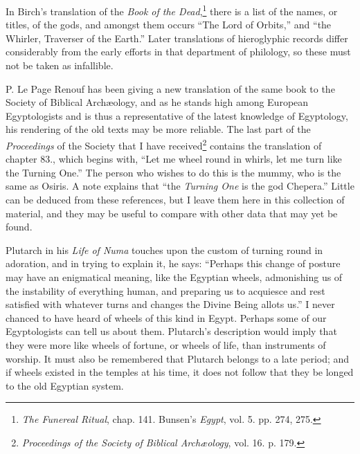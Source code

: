 \documentclass[a4paper, 11pt, oneside, polutonikogreek, english]{article}
\begin{document}
In Birch's translation of the \emph{Book of the Dead},\footnote{\emph{The Funereal Ritual}, chap. 141. Bunsen's \emph{Egypt}, vol. 5. pp. 274, 275.} there is a list of the names, or titles, of the gods, and amongst them occurs ``The Lord of Orbits,'' and ``the Whirler, Traverser of the Earth.'' Later translations of hieroglyphic records differ considerably from the early efforts in that department of philology, so these must not be taken as infallible.

P. Le Page Renouf has been giving a new translation of the same book to the Society of Biblical Archæology, and as he stands high among European Egyptologists and is thus a representative of the latest knowledge of Egyptology, his rendering of the old texts may be more reliable. The last part of the \emph{Proceedings} of the Society that I have received\footnote{\emph{Proceedings of the Society of Biblical Archæology}, vol. 16. p. 179.} contains the translation of chapter 83., which begins with, ``Let me wheel round in whirls, let me turn like the Turning One.'' The person who wishes to do this is the mummy, who is the same as Osiris. A note explains that ``the \emph{Turning One} is the god Chepera.'' Little can be deduced from these references, but I leave them here in this collection of material, and they may be useful to compare with other data that may yet be found.

Plutarch in his \emph{Life of Numa} touches upon the custom of turning round in adoration, and in trying to explain it, he says: ``Perhaps this change of posture may have an enigmatical meaning, like the Egyptian wheels, admonishing us of the instability of everything human, and preparing us to acquiesce and rest satisfied with whatever turns and changes the Divine Being allots us.'' I never chanced to have heard of wheels of this kind in Egypt. Perhaps some of our Egyptologists can tell us about them. Plutarch's description would imply that they were more like wheels of fortune, or wheels of life, than instruments of worship. It must also be remembered that Plutarch belongs to a late period; and if wheels existed in the temples at his time, it does not follow that they be longed to the old Egyptian system.
\end{document}
